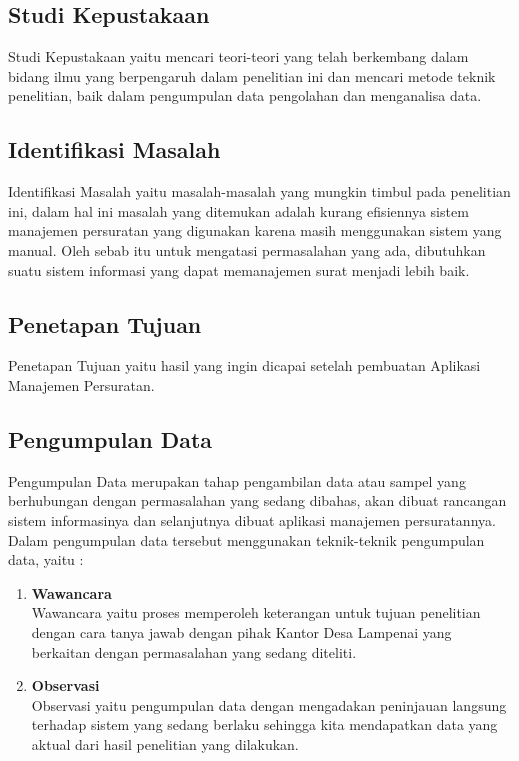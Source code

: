 \subsection{Studi Kepustakaan}

Studi Kepustakaan yaitu mencari teori-teori yang telah berkembang dalam bidang ilmu yang berpengaruh dalam penelitian ini dan mencari metode teknik penelitian, baik dalam pengumpulan data pengolahan dan menganalisa data.

\subsection{Identifikasi Masalah}

Identifikasi Masalah yaitu masalah-masalah yang mungkin timbul pada penelitian ini, dalam hal ini masalah yang ditemukan adalah kurang efisiennya sistem manajemen persuratan yang digunakan karena masih menggunakan sistem yang manual. Oleh sebab itu untuk mengatasi permasalahan yang ada, dibutuhkan suatu sistem informasi yang dapat memanajemen surat menjadi lebih baik.

\subsection{Penetapan Tujuan}

Penetapan Tujuan yaitu hasil yang ingin dicapai setelah pembuatan Aplikasi Manajemen Persuratan.

\subsection{Pengumpulan Data}

Pengumpulan Data merupakan tahap pengambilan data atau sampel yang berhubungan dengan permasalahan yang sedang dibahas, akan dibuat rancangan sistem informasinya dan selanjutnya dibuat aplikasi manajemen persuratannya. Dalam pengumpulan data tersebut menggunakan teknik-teknik pengumpulan data, yaitu :

\begin{enumerate} [label=\textbf{\alph*.}]

    \item \textbf{Wawancara} \\ 
    Wawancara yaitu proses memperoleh keterangan untuk tujuan penelitian dengan cara tanya jawab dengan pihak Kantor Desa Lampenai yang berkaitan dengan permasalahan yang sedang diteliti.
    \item \textbf{Observasi} \\
    Observasi yaitu pengumpulan data dengan mengadakan peninjauan langsung terhadap sistem yang sedang berlaku sehingga kita mendapatkan data yang aktual dari hasil penelitian yang dilakukan.
    
\end{enumerate}